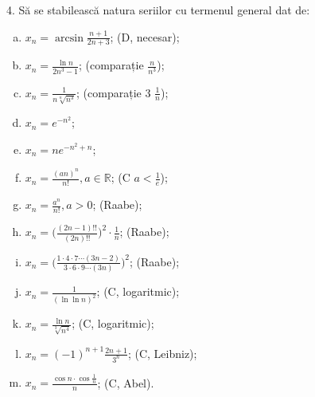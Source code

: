 \documentclass[11pt,a4paper]{article}
\newcommand\RR{\mathbb{R}}
\theoremstyle{dotless}
\theoremstyle{dotlessdr}
\begin{document}
\vspace{1cm}

4. Să se stabilească natura seriilor cu termenul general dat de:
\begin{enumerate}[(a)]
\item $x_n = \arcsin \frac{n+1}{2n + 3}$; \hfill (D, necesar);
\item $x_n = \frac{\ln n}{2n^3 - 1}$; \hfill (comparație $\frac{n}{n^3}$);
\item $x_n = \frac{1}{n \sqrt[n]{n^3}}$; \hfill (comparație 3 $\frac{1}{n}$);
\item $x_n = e^{-n^2}$;
\item $x_n = ne^{-n^2 + n}$;
\item $x_n = \frac{(an)^n}{n!}, a \in \RR$; \hfill (C $a < \frac{1}{e}$);
\item $x_n = \frac{a^n}{n!}, a > 0$; \hfill (Raabe);
\item $x_n = \Big( \frac{(2n - 1)!!}{(2n)!!} \Big)^2 \cdot \frac{1}{n}$; \hfill (Raabe);
\item $x_n = \Big( \frac{1 \cdot 4 \cdot 7 \cdots (3n - 2)}{3 \cdot 6 \cdot 9 \cdots (3n)} \Big)^2$; \hfill (Raabe);
\item $x_n = \frac{1}{(\ln \ln n)^2}$; \hfill (C, logaritmic);
\item $x_n = \frac{\ln n}{\sqrt[3]{n^4}}$; \hfill (C, logaritmic);
\item $x_n = (-1)^{n+1} \frac{2n+1}{3^n}$; \hfill (C, Leibniz);
\item $x_n = \frac{\cos n \cdot \cos \frac{1}{n}}{n}$; \hfill (C, Abel).
\end{enumerate}
\end{document}
